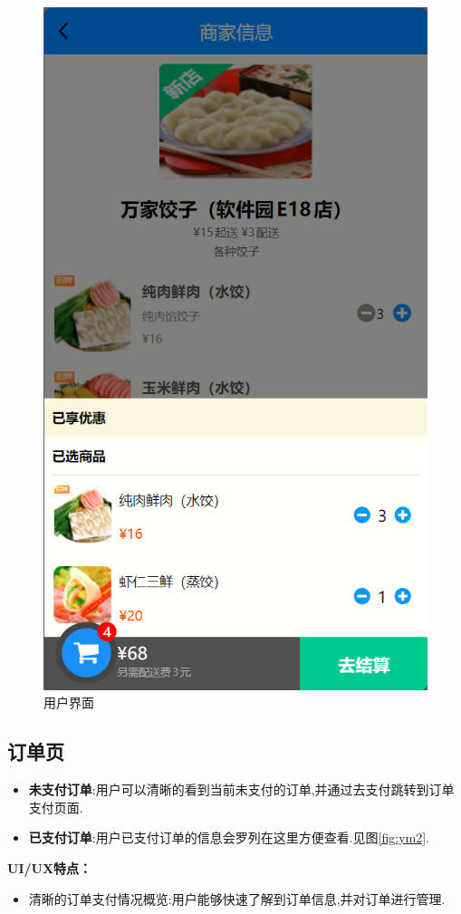 \begin{figure}[h]
\begin{minipage}[b]{0.3\linewidth}
        \includegraphics[width=\linewidth]{uiFigs/商家详情.png}
     \end{minipage}
     
    \caption{用户界面}
    \label{fig:yhjm}
\end{figure}

\subsection{订单页}
\begin{itemize}
    \item \textbf{未支付订单}:用户可以清晰的看到当前未支付的订单,并通过去支付跳转到订单支付页面.
    \item \textbf{已支付订单}:用户已支付订单的信息会罗列在这里方便查看.见图\ref{fig:ym2}.
\end{itemize}
 \textbf{UI/UX特点：}
\begin{itemize}
    \item 清晰的订单支付情况概览:用户能够快速了解到订单信息,并对订单进行管理.
\end{itemize}
